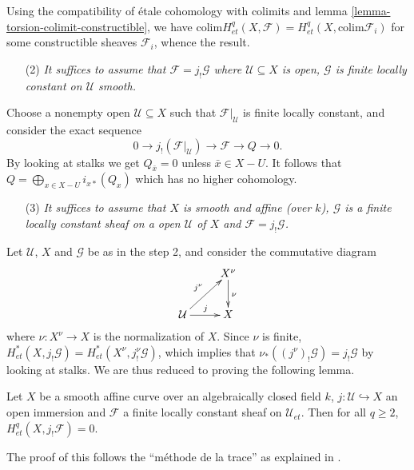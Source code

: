 \noindent
Using the compatibility of \'etale cohomology with colimits and lemma
\ref{lemma-torsion-colimit-constructible}, we have $\text{colim}
H_{et}^q(X, \mathcal{F}) = H_{et}^q(X, \text{colim} \mathcal{F}_i)$ for some
constructible sheaves $\mathcal{F}_i$, whence the result.

\begin{enumerate}
\item[(2)]
{\it It suffices to assume that $\mathcal{F} = j_!\mathcal{G}$ where
$\mathcal{U}\subseteq X$ is open, $\mathcal{G}$ is finite locally constant on
$\mathcal{U}$ smooth.}
\end{enumerate}

\noindent
Choose a nonempty open $\mathcal{U}\subseteq X$ such that
$\mathcal{F}|_\mathcal{U}$ is finite locally constant, and consider the exact
sequence
$$
0\to j_!(\mathcal{F}|_\mathcal{U})\to \mathcal{F}\to Q\to 0.
$$
By looking at stalks we get $Q_{\bar x}=0$ unless $\bar x\in X-U$. It follows
that $\displaystyle Q = \bigoplus_{x\in X-U} i_{x*} (Q_x)$
which has no higher cohomology.

\begin{enumerate}
\item[(3)]
{\it It suffices to assume that $X$ is smooth and affine (over $k$),
$\mathcal{G}$ is a finite locally constant sheaf on a open $\mathcal{U}$ of $X$
and $\mathcal{F} = j_!\mathcal{G}$.}
\end{enumerate}

\noindent
Let $\mathcal{U}$, $X$ and $\mathcal{G}$ be as in the step 2, and consider the
commutative diagram
$$
\xymatrix{
& {X^\nu} \ar^{\nu}[d]\\
{\mathcal{U}} \ar^{j}[r] \ar^{j^\nu}[ur] & {X}
}
$$
where $\nu: X^\nu \to X$ is the normalization of $X$. Since $\nu$ is finite,
$H_{et}^*(X, j_!\mathcal{G}) = H_{et}^*(X^\nu, j^\nu_!\mathcal{G})$, which
implies that $\nu_*((j^\nu)_!\mathcal{G}) = j_!\mathcal{G}$ by looking at
stalks. We are thus reduced to proving the following lemma.

\begin{lemma}
\label{lemma-vanishing-easier}
Let $X$ be a smooth affine curve over an algebraically closed field $k$, $j:
\mathcal{U} \hookrightarrow X$ an open immersion and $\mathcal{F}$ a finite
locally constant sheaf on $\mathcal{U}_{et}$. Then for all $q \geq 2$,
$H_{et}^q(X, j_! \mathcal{F}) = 0$.
\end{lemma}


\noindent
The proof of this follows the
``m\'ethode de la trace''
as explained in \cite[Expos\'e IX, \S5]{SGA4}.

